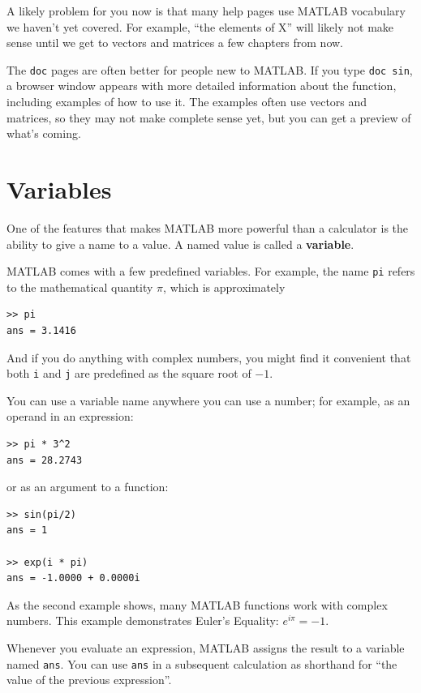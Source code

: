 \documentclass[
]{book}
\begin{document}
A likely problem for you now is that many help pages use MATLAB 
vocabulary we haven't yet covered.  
For example, ``the elements of X'' will likely not make sense until
we get to vectors and matrices a few chapters from now.

The {\tt doc} pages are often better for people new to MATLAB.  
If you type {\tt doc sin}, a
browser window appears with more detailed information about the
function, including examples of how to use it.  The examples often
use vectors and matrices, so they may not make complete sense yet, 
but you can
get a preview of what's coming.


\section{Variables}

One of the features that makes MATLAB more powerful than a calculator
is the ability to give a name to a value.  A named value is called
a {\bf variable}.

MATLAB comes with a few predefined variables.  For
example, the name {\tt pi} refers to the
mathematical quantity $\pi$, which is approximately

\begin{verbatim}
>> pi
ans = 3.1416
\end{verbatim}

And if you do anything with complex numbers, you might find it
convenient that both {\tt i} and {\tt j} are predefined as the square
root of $-1$.

You can use a variable name anywhere you can use a number; for example, as
an operand in an expression:

\begin{verbatim}
>> pi * 3^2
ans = 28.2743
\end{verbatim}

or as an argument to a function:

\begin{verbatim}
>> sin(pi/2)
ans = 1

>> exp(i * pi)
ans = -1.0000 + 0.0000i
\end{verbatim}

As the second example shows, many MATLAB functions work with
complex numbers.  This example demonstrates Euler's Equality:
$e^{i \pi} = -1$.

Whenever you evaluate an expression, MATLAB assigns the result to
a variable named {\tt ans}.  You can use {\tt ans} in a subsequent
calculation as shorthand for ``the value of the previous expression''.
\end{document}
